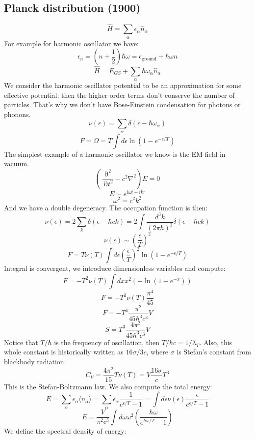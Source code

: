 \documentclass[12 pt]{article}
\DeclareMathOperator {\p} {\partial}
\begin{document}
\subsection*{Planck distribution (1900)}
\[    \hat   H = \sum_{\alpha} \epsilon_{\alpha} \hat n_{\alpha}      \]
For example for harmonic oscillator we have:
\[      \epsilon_n = (n + \frac{1}{2}) \hbar \omega = \epsilon_{\text{ground}} + \hbar \omega n        \]
\[        \hat H = E_{GS} + \sum_{\alpha} \hbar \omega_{\alpha} \hat n_{\alpha}     \]
We consider the harmonic oscillator potential to be an approximation for some effective potential; then the higher order terms don't conserve the number of particles. That's why we don't have Bose-Einstein condensation for photons or phonons.
\[      \nu(\epsilon) = \sum_{\alpha} \delta(\epsilon - \hbar\omega_{\alpha})      \]
\[        F = \Omega = T \int   d \epsilon \ln(1 - e^{-\epsilon/T} )    \]
The simplest example of a harmonic oscillator we know is the EM field in vacuum.
\[        \left(  \frac{\p^2}{\p t^2} - c^2 \nabla^2  \right) E  = 0   \]
\[        E \sim e^{i\omega t - i k r}       \]
\[        \omega^2 = c^2 k^2       \]
And we have a double degeneracy. The occupation function is then:
\[        \nu(\epsilon) = 2 \sum_k \delta(\epsilon - \hbar c k)   = 2 \int \frac{d^3 k}{(2\pi \hbar)^3} \delta(\epsilon - \hbar c k)   \]
\[         \nu(\epsilon) \sim \left( \frac{\epsilon}{T} \right)^2      \]
\[         F = T \nu(T) \int d \epsilon  \left( \frac{\epsilon}{T} \right)^2 \ln (1 - e^{-\epsilon/T})         \]
Integral is convergent, we introduce dimensionless variables and compute:
\[        F = - T^2 \nu(T) \int dx x^2 ( - \ln(1 - e^{-x}))      \]
\[        F = - T^2 \nu(T) \frac{\pi^4}{45}      \]
\[        F = - T^4 \frac{\pi^2}{45 \hbar^3 c^3} V            \]
\[        S =     T^3 \frac{4 \pi^2}{45 \hbar^3 c^3} V      \]
Notice that $T/\hbar$ is the frequency of oscillation, then $T/\hbar c = 1/\lambda_T$. Also, this whole constant is historically written as $16 \sigma / 3c$, where $\sigma$ is Stefan's constant from blackbody radiation.
\[      C_V = \frac{4\pi^2}{15} T \nu(T) = V \frac{16 \sigma}{c} T^3     \]
This is the Stefan-Boltzmann law. We also compute the total energy:
\[       E = \sum_{\alpha} \epsilon_{\alpha} \langle n_{\alpha} \rangle  = \sum_{\alpha} \epsilon_{\alpha} \frac{1}{e^{\epsilon/T} - 1}  = \int d\epsilon \nu(\epsilon) \frac{\epsilon}{e^{\epsilon/T} - 1} \]
\[       E = \frac{V}{\pi^2 c^3} \int d\omega \omega^2 \left( \frac{\hbar \omega}{e^{\hbar \omega/T} - 1} \right)    \]
We define the spectral density of energy:
\end{document}
